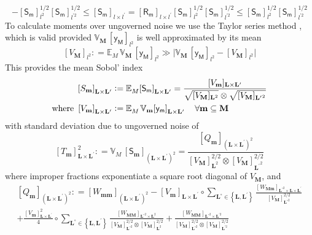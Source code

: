 \documentclass[preprint,12pt]{elsarticle}
\newcommand*{\M}[1]{\ensuremath{#1}\xspace}
\newcommand*{\x}{\times}
\newcommand*{\mi}[1]{\mathbf{#1}}
\newcommand*{\rv}[1]{\mathsf{#1}}
\newcommand*{\te}[2][]{\left\lbrack{#2}\right\rbrack_{#1}}
\newcommand*{\tte}[2][]{\lbrack{#2}\rbrack_{#1}}
\newcommand*{\deq}{\M{\mathrel{\mathop:}=}}
\newcommand{\T}[1]{\text{#1}}
\newcommand*{\evt}[3][]{\mathbb{E}_{#3}^{#1}\!#2}
\newcommand*{\cov}[3][]{\ifthenelse{\equal{#1}{}}{\mathbb{V}_{#3}\!\left\lbrack{#2}\right\rbrack}{\mathbb{V}_{#3}\!\left\lbrack{#2,#1}\right\rbrack}}
\newcommand*{\covt}[2]{\mathbb{V}_{#2}\!{#1}}
\newcommand*{\set}[1]{\M{\left\lbrace{#1}\right\rbrace}}
\begin{document}
    \begin{equation}
        -\te[l^2]{\rv{S_m}}^{1/2}\te[l^{\prime 2}]{\rv{S_m}}^{1/2} \leq
            \te[l\x l^{\prime}]{\rv{S_m}} = 
            \te[l\x l^{\prime}]{\rv{R_{m}}}\te[l^2]{\rv{S_m}}^{1/2}\te[l^{\prime 2}]{\rv{S_m}}^{1/2} \leq \te[l^2]{\rv{S_m}}^{1/2}\te[l^{\prime 2}]{\rv{S_m}}^{1/2}
    \end{equation}
    To calculate moments over ungoverned noise we use the Taylor series method \cite[pp.353]{Kendall1994}, which is valid provided $\covt{\,\te[l^{2}]{\rv{y_M}}}{\mi{M}}$ is well approximated by its mean
    \begin{equation}
        \te[l^{2}]{V_{\mi{M}}} \deq \evt{\,\covt{\,\te[l^2]{\rv{y_M}}}{\mi{M}}}{M} \gg \big\vert\covt{\,\te[l^{2}]{\rv{y_M}}}{\mi{M}} - \te[l^{2}]{V_{\mi{M}}}\big\vert
    \end{equation}
    This provides the mean Sobol' index
    \begin{align}\label{def:GSI:mean}
        \te[\mi{L\x L^{\prime}}]{S_{\mi{m}}} &\deq \evt{\te[\mi{L\x L^{\prime}}]{\rv{S_m}}}{M}
        = \frac{\tte[\mi{L\x L^{\prime}}]{V_{\mi{m}}}}{\sqrt{\tte[\mi{L}^{2}]{V_{\mi{M}}}} \otimes \sqrt{\tte[\mi{L^{\prime}}^2]{V_{\mi{M}}}}} \\            
        \T{where }\te[\mi{L\x L^{\prime}}]{V_{\mi{m}}} &\deq \evt{\; \cov{\rv{y_m}}{\mi{m}}}{M}_{\mi{L\x L^{\prime}}} \quad \forall \mi{m}\subseteq \mi{M}
    \end{align}
    with standard deviation due to ungoverned noise of
    \begin{equation} \label{def:GSI:variance}
        \te[\mi{L\x L^{\prime}}]{T_{\mi{m}}}^{2} \deq 
        \covt{\,\te[(\mi{L\x L^{\prime}})^2]{\rv{S}_{\mi{m}}}}{M} = \frac{\te[(\mi{L\x L^{\prime}})^2]{Q_{\mi{m}}}}{\te[\mi{L}^{2}]{V_{\mi{M}}}^{2/2} \otimes \te[\mi{L^{\prime}}^{2}]{V_{\mi{M}}}^{2/2}}
    \end{equation}
    where improper fractions exponentiate a square root diagonal of $V_{\mi{M}}$, and
    \begin{multline}\label{def:GSI:Q}
        \te[(\mi{L\x L^{\prime}})^{2}]{Q_{\mi{m}}} \deq \te[(\mi{L\x L^{\prime}})^{2}]{W_{\mi{mm}}}
        - \te[\mi{L\x L^{\prime}}]{V_{\mi{m}}} \circ \sum_{\mi{L}^{\circ} \in \set{\mi{L, L^{\prime}}}} \frac{\te[\mi{L}^{\circ 2}\x\mi{L\x L^{\prime}}]{W_{\mi{Mm}}}} {\te[\mi{L}^{\circ 2}]{V_{\mi{M}}}^{2/2}} \\                
         + \frac{\te[\mi{L\x L^{\prime}}]{V_{\mi{m}}}^{2}}{4} \circ \sum_{\mi{L}^{\circ} \in \set{\mi{L, L^{\prime}}}} \frac{\te[\mi{L}^{\circ 2}\x\mi{L}^{2}]{W_{\mi{MM}}}} {\te[\mi{L}^{\circ 2}]{V_{\mi{M}}}^{2/2} \otimes \te[\mi{L}^{2}]{V_{\mi{M}}}^{2/2}}
        + \frac{\te[\mi{L}^{\circ 2}\x\mi{L}^{\prime 2}]{W_{\mi{MM}}}} {\te[\mi{L}^{\circ 2}]{V_{\mi{M}}}^{2/2} \otimes \te[\mi{L}^{\prime 2}]{V_{\mi{M}}}^{2/2}}
    \end{multline}
\end{document}
